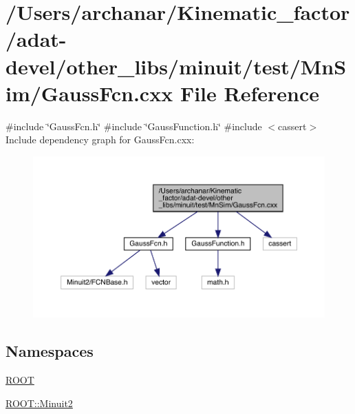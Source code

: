 \hypertarget{adat-devel_2other__libs_2minuit_2test_2MnSim_2GaussFcn_8cxx}{}\section{/\+Users/archanar/\+Kinematic\+\_\+factor/adat-\/devel/other\+\_\+libs/minuit/test/\+Mn\+Sim/\+Gauss\+Fcn.cxx File Reference}
\label{adat-devel_2other__libs_2minuit_2test_2MnSim_2GaussFcn_8cxx}
{\ttfamily \#include \char`\"{}Gauss\+Fcn.\+h\char`\"{}}\newline
{\ttfamily \#include \char`\"{}Gauss\+Function.\+h\char`\"{}}\newline
{\ttfamily \#include $<$cassert$>$}\newline
Include dependency graph for Gauss\+Fcn.\+cxx\+:
\nopagebreak
\begin{figure}[H]
\begin{center}
\leavevmode
\includegraphics[width=350pt]{dc/dcf/adat-devel_2other__libs_2minuit_2test_2MnSim_2GaussFcn_8cxx__incl}
\end{center}
\end{figure}
\subsection*{Namespaces}
\begin{DoxyCompactItemize}
\item 
 \mbox{\hyperlink{namespaceROOT}{R\+O\+OT}}
\item 
 \mbox{\hyperlink{namespaceROOT_1_1Minuit2}{R\+O\+O\+T\+::\+Minuit2}}
\end{DoxyCompactItemize}
